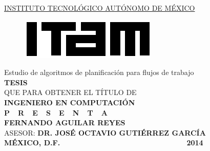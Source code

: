\begin{titlepage}
\begin{center}

\textsc{\underline{INSTITUTO TECNOLÓGICO AUTÓNOMO DE MÉXICO}}\\[1.5cm] %

\begin{figure}[h]
\centering
\includegraphics[scale=2]{imagenes/logoitam.png}\\[1.4cm] %
\end{figure} 

\huge{Estudio de algoritmos de planificación para flujos de trabajo}\\[2.6cm] %

\large \textbf{TESIS}\\ QUE PARA OBTENER EL TÍTULO DE\\ \textbf{INGENIERO EN COMPUTACIÓN}\\[0.8cm]
\large \textbf{P\ \  R\ \  E\ \  S\ \  E\ \  N\ \  T\ \  A}\\[0.8cm]

\textbf{FERNANDO AGUILAR REYES}\\[1.0cm]

\large ASESOR: \textbf{DR. JOSÉ OCTAVIO GUTIÉRREZ GARCÍA}\\[1.4cm]

\large \textbf{MÉXICO, D.F.} {\ \ \ \ \ \ \ \ \ \ \ \ \ \ \ \ \ \ \ \ \ \ \ \ \ \ \ \ \ \ \ \ \ \ } \textbf{2014}

\vfill
\end{center}

\end{titlepage}
